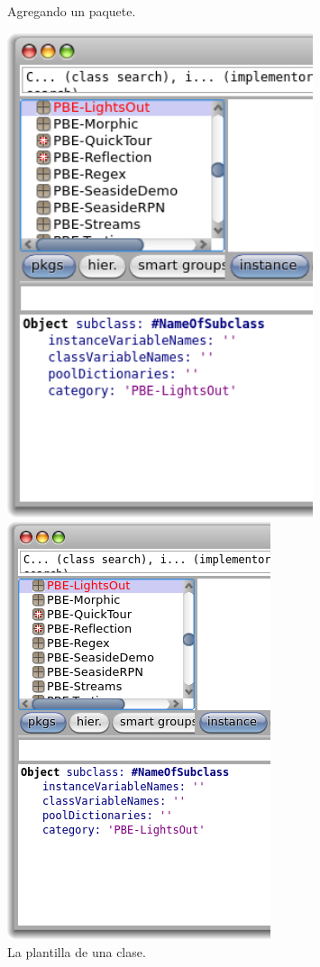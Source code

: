 \documentclass[a4paper,10pt,twoside]{book}
\begin{document}
\begin{figure}[htb]
\begin{minipage}[b]{0.48\textwidth}
	\caption{Agregando un paquete.
	}
\end{minipage}
\hfill
\begin{minipage}[b]{0.48\textwidth}
\ifluluelse
	{\centerline {\includegraphics[width=0.8\textwidth]{ClassTemplate}}}
	{\centerline {\includegraphics[scale=0.6]{ClassTemplate}}}
	\caption{La plantilla de una clase.
	}
\end{minipage}
\end{figure}
\end{document}
